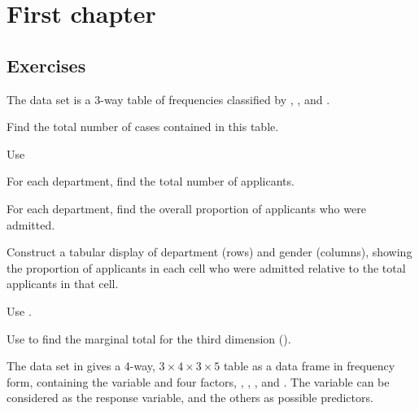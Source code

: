 \documentclass[10pt]{report}
\begin{document}
\chapter{First chapter}
\section{Exercises}

\begin{Exercises}

\exercise The data set  is a 3-way table of frequencies
classified by , , and .
  \begin{enumerate*}
    \item Find the total number of cases contained in this table.
    \begin{ans}
    Use 
    \end{ans}
    \item For each department, find the total number of applicants.
    \item For each department, find the overall proportion of applicants who were admitted.
    \item Construct a tabular display of department (rows) and gender (columns), showing
    the proportion of applicants in each cell who were admitted
    relative to the total applicants in that cell.
  \end{enumerate*}
\begin{answer}
	\begin{enumerate*}
		\item Use .
		\item Use  to find the marginal total for the third dimension ().
		\item
	\end{enumerate*}
\end{answer}

\exercise The data set  in  
gives a 4-way, $3 \times 4 \times 3 \times 5$ 
table as a data frame in
frequency form, containing the variable  and four factors,
,
,
, and
.  The variable  can be considered as the
response variable, and the others as possible predictors.


\end{Exercises}
\end{document}

